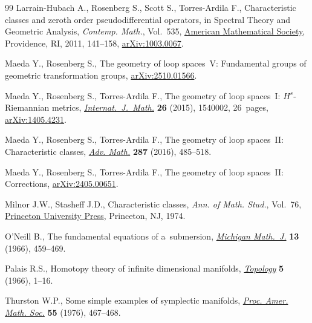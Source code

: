 \documentclass[pdftex]{sigma}
\numberwithin{equation}{section}
\theoremstyle{definition}
\begin{document}
\begin{thebibliography}{99}
Larrain-Hubach A., Rosenberg S., Scott S., Torres-Ardila F., Characteristic
 classes and zeroth order pseudodifferential operators, in Spectral Theory and
 Geometric Analysis, \textit{Contemp. Math.}, Vol.~535,
 \href{https://doi.org/10.1090/conm/535/10539}{American Mathematical Society},
 Providence, RI, 2011, 141--158,
 \href{http://arxiv.org/abs/1003.0067}{arXiv:1003.0067}.

Maeda Y., Rosenberg S., The geometry of loop spaces~{V}: {F}undamental groups
 of geometric transformation groups,
 \href{http://arxiv.org/abs/2510.01566}{arXiv:2510.01566}.

Maeda Y., Rosenberg S., Torres-Ardila F., The geometry of loop spaces~{I}:
 {$H^s$}-{R}iemannian metrics,
 \href{https://doi.org/10.1142/S0129167X15400029}{\textit{Internat.~J.~Math.}}
 \textbf{26} (2015), 1540002, 26~pages,
 \href{http://arxiv.org/abs/1405.4231}{arXiv:1405.4231}.

Maeda Y., Rosenberg S., Torres-Ardila F., The geometry of loop spaces~{II}:
 {C}haracteristic classes,
 \href{https://doi.org/10.1016/j.aim.2015.10.001}{\textit{Adv. Math.}}
 \textbf{287} (2016), 485--518.

Maeda Y., Rosenberg S., Torres-Ardila F., The geometry of loop spaces~{II}: {C}orrections,
 \href{http://arxiv.org/abs/2405.00651}{arXiv:2405.00651}.


Milnor J.W., Stasheff J.D., Characteristic classes, \textit{Ann. of Math.
 Stud.}, Vol.~76, \href{https://doi.org/10.1515/9781400881826}{Princeton
 University Press}, Princeton, NJ, 1974.

O'Neill B., The fundamental equations of a~submersion,
 \href{https://doi.org/10.1307/mmj/1028999604}{\textit{Michigan Math.~J.}}
 \textbf{13} (1966), 459--469.

Palais R.S., Homotopy theory of infinite dimensional manifolds,
 \href{https://doi.org/10.1016/0040-9383(66)90002-4}{\textit{Topology}}
 \textbf{5} (1966), 1--16.

Thurston W.P., Some simple examples of symplectic manifolds,
 \href{https://doi.org/10.2307/2041749}{\textit{Proc. Amer. Math. Soc.}}
 \textbf{55} (1976), 467--468.

\end{thebibliography}\LastPageEnding
\end{document}
